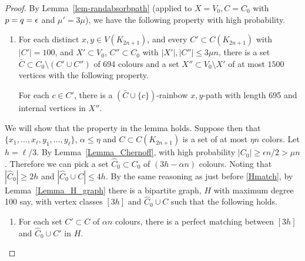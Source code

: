 \begin{proof} By Lemma~\ref{lem-randabsorbpath} (applied to $X=V_0, C=C_0$ with $p=q=\epsilon$ and $\mu'=3\mu$), we have the following property with high probability.
\begin{enumerate}[label = {\bfseries \Alph{propcounter}\arabic{enumi}}]
\item For each distinct $x,y\in V(K_{2n+1})$, and every $C'\subset C(K_{2n+1})$ with $|C'|=100$, and $X'\subset V_0$, $C''\subset C_0$ with $|X'|,|C''|\leq 3\mu n$,  there is a set $\bar{C}\subset C_0\setminus (C'\cup C'')$ of 694 colours and a set $X''\subset V_0\setminus X'$ of at most $1500$ vertices with the following property.

For each $c\in C'$,
there is a $(\bar{C}\cup \{c\})$-rainbow $x,y$-path with length 695 and internal vertices in $X''$.\label{bbb2}
\end{enumerate}

We will show that the property in the lemma holds. Suppose then that  $\{x_1,\ldots,x_{\ell},y_1,\ldots,y_\ell\}$, $\alpha\leq \eta$ and $C\subset C(K_{2n+1})$ is a set of at most $\eta n$ colors.
Let $h=\ell/3$. By Lemma~\ref{Lemma_Chernoff}, with high probability 
$|C_0|\geq \epsilon n/2> \mu n$. Therefore we can pick a set $\hat C_0 \subset C_0$ of $(3h-\alpha n)$ colours. Noting that $|\hat C_0|\geq 2h$ and $|\hat C_0\cup C|\leq 4h$.
By the same reasoning as just before \ref{Hmatch}, by Lemma~\ref{Lemma_H_graph} there is a bipartite graph, $H$ with maximum degree 100 say, with  vertex classes $[3h]$ and $\hat C_0\cup C$ such that the following holds.

\begin{enumerate}[label = {\bfseries \Alph{propcounter}\arabic{enumi}}]\addtocounter{enumi}{1}
\item For each set $C'\subset C$ of $\alpha n$ colours, there is a perfect matching between $[3h]$ and $\hat C_0\cup C'$ in $H$.\label{Hmatch2}
\end{enumerate}


\end{proof}
